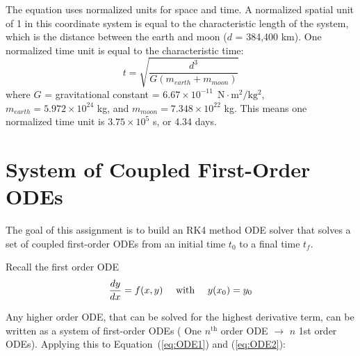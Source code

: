 \vspace{\baselineskip}

The equation uses normalized units for space and time. A normalized spatial unit of 1 in this coordinate
system is equal to the characteristic length of the system, which is the distance between the earth and moon
($d$ = 384,400 km). One normalized time unit is equal to the characteristic time:
\begin{equation*}
    t = \sqrt{\frac{d^3}{G\left(m_{earth} + m_{moon}\right)}}
\end{equation*}
where $G$ = gravitational constant = $6.67 \times 10^{-11} \SI{}{\ \N\cdot\m^2/\kg^2}$, $m_{earth} = 5.972 \times 10^{24}$ kg, and $m_{moon} = 7.348 \times 10^{22}$ kg. This means one normalized time unit is $3.75 \times 10^5$ s, or 4.34 days.

\pagebreak

\section{System of Coupled First-Order ODEs}

The goal of this assignment is to build an RK4 method ODE solver that solves a set of coupled first-order ODEs from an initial time $t_0$ to a final time $t_f$.

\vspace{\baselineskip}

Recall the first order ODE
\begin{equation*}
    \frac{dy}{dx} = f(x,y) \quad \text{ with } \quad y(x_0) = y_0
\end{equation*}

Any higher order ODE, that can be solved for the highest derivative term, can be written as a system of first-order ODEs (\color{magenta} One $n^{\textrm{th}}$ order ODE $\rightarrow$ $n$ 1st order ODEs\color{white}). Applying this to Equation~(\ref{eq:ODE1}) and (\ref{eq:ODE2}):

\vspace{\baselineskip}


